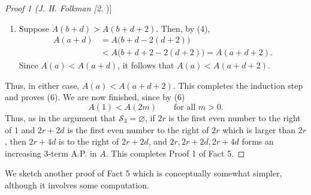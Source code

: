 \documentclass[10pt]{article}
\newcommand{\Scal}{\mathscr{S}}
\begin{document}
\begin{proof}[Proof 1 (J. H. Folkman [2])]
\begin{enumerate}[label=(\roman*),leftmargin=2.3em]
\item Suppose $A(b+d)>A(b+d+2)$. Then, by (4),
\[
 \begin{aligned}
 A(a+d)&=A\bigl(b+d-2(d+2)\bigr)\\
       &<A\bigl(b+d+2-2(d+2)\bigr)=A(a+d+2).
 \end{aligned}
\]
Since $A(a)<A(a+d)$, it follows that $A(a)<A(a+d+2)$.
\end{enumerate}
Thus, in either case, $A(a)<A(a+d+2)$. This completes the induction step
and proves (6). We are now finished, since by (6)
\[
 A(1)<A(2m)\qquad\text{for all }m>0.
\]
Thus, as in the argument that $\Scal_3=\varnothing$, if $2r$ is the first
even number to the right of $1$ and $2r+2d$ is the first even number to
the right of $2r$ which is larger than $2r$, then $2r+4d$ is to the
right of $2r+2d$, and $2r,2r+2d,2r+4d$ forms an increasing 3-term A.P. in
$A$. This completes Proof 1 of Fact 5.
\end{proof}

We sketch another proof of Fact 5 which is conceptually somewhat simpler,
although it involves some computation.
\end{document}

